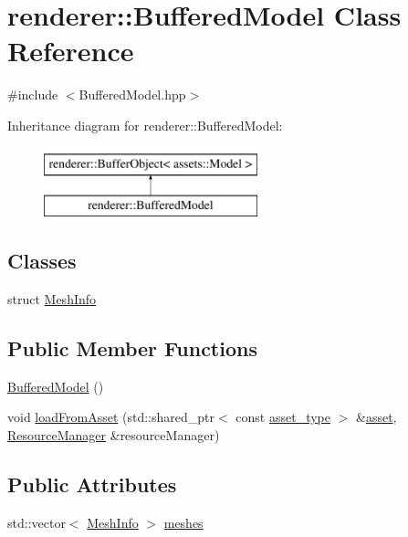 \hypertarget{classrenderer_1_1BufferedModel}{\section{renderer\-:\-:Buffered\-Model Class Reference}
\label{classrenderer_1_1BufferedModel}
}


{\ttfamily \#include $<$Buffered\-Model.\-hpp$>$}

Inheritance diagram for renderer\-:\-:Buffered\-Model\-:\begin{figure}[H]
\begin{center}
\leavevmode
\includegraphics[height=2.000000cm]{classrenderer_1_1BufferedModel}
\end{center}
\end{figure}
\subsection*{Classes}
\begin{DoxyCompactItemize}
\item 
struct \hyperlink{structrenderer_1_1BufferedModel_1_1MeshInfo}{Mesh\-Info}
\end{DoxyCompactItemize}
\subsection*{Public Member Functions}
\begin{DoxyCompactItemize}
\item 
\hyperlink{classrenderer_1_1BufferedModel_a845d58aa561473809bccc020c7683400}{Buffered\-Model} ()
\item 
void \hyperlink{classrenderer_1_1BufferedModel_a69f6312a15672cd18481c554ece47a86}{load\-From\-Asset} (std\-::shared\-\_\-ptr$<$ const \hyperlink{classrenderer_1_1BufferObject_a651cbaff8aa7148d72a9eaf71ad3636e}{asset\-\_\-type} $>$ \&\hyperlink{classrenderer_1_1BufferObject_ad747c7e09a4acda6847b6fca9977eed6}{asset}, \hyperlink{classrenderer_1_1ResourceManager}{Resource\-Manager} \&resource\-Manager)
\end{DoxyCompactItemize}
\subsection*{Public Attributes}
\begin{DoxyCompactItemize}
\item 
std\-::vector$<$ \hyperlink{structrenderer_1_1BufferedModel_1_1MeshInfo}{Mesh\-Info} $>$ \hyperlink{classrenderer_1_1BufferedModel_a68d483bfd255bd335108ddd7da2496b2}{meshes}
\end{DoxyCompactItemize}
